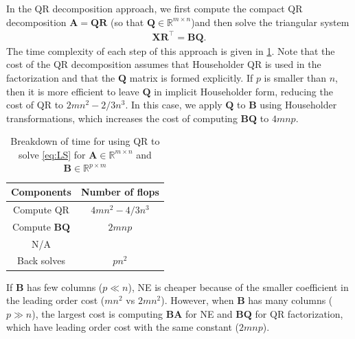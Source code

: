 \documentclass{article}
\newcommand{\mat}[1]{\mathbf{#1}}
\begin{document}
In the QR decomposition approach, we first compute the compact QR decomposition $\mat{A} = \mat{Q}\mat{R}$ (so that $\mat{Q}\in \mathbb{R}^{m \times n}$)and then solve the  triangular system
\begin{align}
\label{eq:QR}  
\mat{X} \mat{R}^\top = \mat{B}\mat{Q}.
\end{align}
The time complexity of each step of this approach is given in \cref{tab:QR-time}.
Note that the cost of the QR decomposition assumes that Householder QR is used in the factorization and that the $\mat{Q}$ matrix is formed explicitly.
If $p$ is smaller than $n$, then it is more efficient to leave $\mat{Q}$ in implicit Householder form, reducing the cost of QR to $2mn^2-2/3n^3$.
In this case, we apply $\mat{Q}$ to $\mat{B}$ using Householder transformations, which increases the cost of computing $\mat{B}\mat{Q}$ to $4mnp$. 

\begin{table}[!ht]
  \centering
  \begin{tabular}{|c|c|}
    \hline
    Components & Number of flops\\
    \hline
    Compute QR & $4mn^2 - 4/3n^3$ \\
    Compute $\mat{B}\mat{Q}$ & $2mnp$\\
    N/A & \\
    Back solves & $pn^2$ \\
    \hline
  \end{tabular}
  \caption{Breakdown of time for using QR to solve \cref{eq:LS} for $\mat{A} \in \mathbb{R}^{m \times n}$ and $\mat{B} \in \mathbb{R}^{p \times m}$}
  \label{tab:QR-time}
\end{table}

If $\mat{B}$ has few columns ($p\ll n$), NE is cheaper because of the smaller coefficient in the leading order cost ($mn^2$ vs $2mn^2$). 
However, when $\mat{B}$ has many columns ($p\gg n$), the largest cost is computing $\mat{B}\mat{A}$ for NE and $\mat{B}\mat{Q}$ for QR factorization, which have leading order cost with the same constant ($2mnp$).
\end{document}
